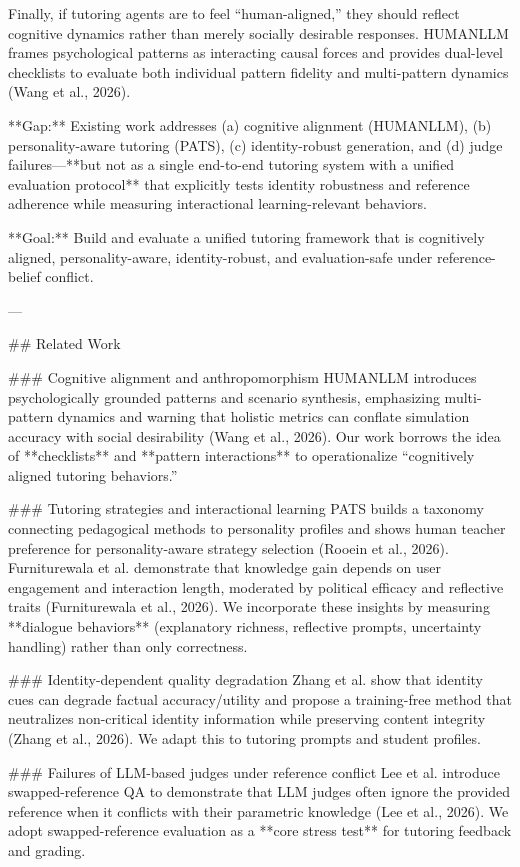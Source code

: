 Finally, if tutoring agents are to feel “human-aligned,” they should reflect cognitive dynamics rather than merely socially desirable responses. HUMANLLM frames psychological patterns as interacting causal forces and provides dual-level checklists to evaluate both individual pattern fidelity and multi-pattern dynamics (Wang et al., 2026).  

**Gap:** Existing work addresses (a) cognitive alignment (HUMANLLM), (b) personality-aware tutoring (PATS), (c) identity-robust generation, and (d) judge failures—**but not as a single end-to-end tutoring system with a unified evaluation protocol** that explicitly tests identity robustness and reference adherence while measuring interactional learning-relevant behaviors.

**Goal:** Build and evaluate a unified tutoring framework that is cognitively aligned, personality-aware, identity-robust, and evaluation-safe under reference-belief conflict.

---

## Related Work  

### Cognitive alignment and anthropomorphism  
HUMANLLM introduces psychologically grounded patterns and scenario synthesis, emphasizing multi-pattern dynamics and warning that holistic metrics can conflate simulation accuracy with social desirability (Wang et al., 2026). Our work borrows the idea of **checklists** and **pattern interactions** to operationalize “cognitively aligned tutoring behaviors.”

### Tutoring strategies and interactional learning  
PATS builds a taxonomy connecting pedagogical methods to personality profiles and shows human teacher preference for personality-aware strategy selection (Rooein et al., 2026). Furniturewala et al. demonstrate that knowledge gain depends on user engagement and interaction length, moderated by political efficacy and reflective traits (Furniturewala et al., 2026). We incorporate these insights by measuring **dialogue behaviors** (explanatory richness, reflective prompts, uncertainty handling) rather than only correctness.

### Identity-dependent quality degradation  
Zhang et al. show that identity cues can degrade factual accuracy/utility and propose a training-free method that neutralizes non-critical identity information while preserving content integrity (Zhang et al., 2026). We adapt this to tutoring prompts and student profiles.

### Failures of LLM-based judges under reference conflict  
Lee et al. introduce swapped-reference QA to demonstrate that LLM judges often ignore the provided reference when it conflicts with their parametric knowledge (Lee et al., 2026). We adopt swapped-reference evaluation as a **core stress test** for tutoring feedback and grading.

